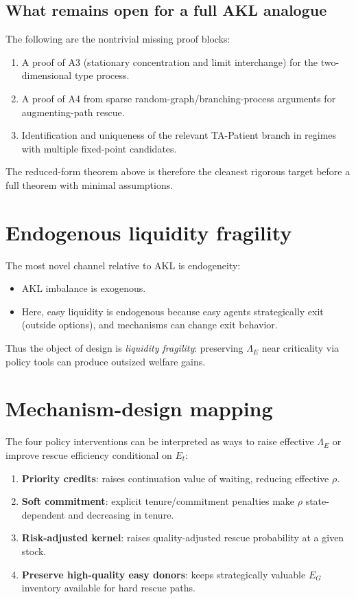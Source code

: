 \documentclass{article}
\begin{document}
\subsection{What remains open for a full AKL analogue}

The following are the nontrivial missing proof blocks:
\begin{enumerate}
  \item A proof of A3 (stationary concentration and limit interchange) for the two-dimensional type process.
  \item A proof of A4 from sparse random-graph/branching-process arguments for augmenting-path rescue.
  \item Identification and uniqueness of the relevant TA-Patient branch in regimes with multiple fixed-point candidates.
\end{enumerate}

The reduced-form theorem above is therefore the cleanest rigorous target before a full theorem with minimal assumptions.

\section{Endogenous liquidity fragility}

The most novel channel relative to AKL is endogeneity:
\begin{itemize}
  \item AKL imbalance is exogenous.
  \item Here, easy liquidity is endogenous because easy agents strategically exit (outside options), and mechanisms can change exit behavior.
\end{itemize}

Thus the object of design is \emph{liquidity fragility}: preserving \(\Lambda_E\) near criticality via policy tools can produce outsized welfare gains.

\section{Mechanism-design mapping}

The four policy interventions can be interpreted as ways to raise effective \(\Lambda_E\) or improve rescue efficiency conditional on \(E_t\):
\begin{enumerate}
  \item \textbf{Priority credits}: raises continuation value of waiting, reducing effective \(\rho\).
  \item \textbf{Soft commitment}: explicit tenure/commitment penalties make \(\rho\) state-dependent and decreasing in tenure.
  \item \textbf{Risk-adjusted kernel}: raises quality-adjusted rescue probability at a given stock.
  \item \textbf{Preserve high-quality easy donors}: keeps strategically valuable \(E_G\) inventory available for hard rescue paths.
\end{enumerate}
\end{document}
